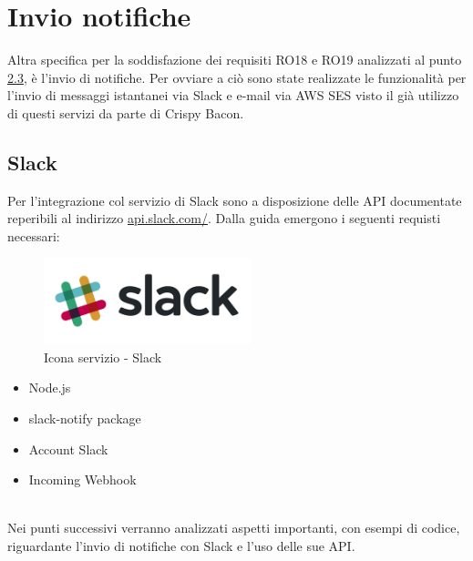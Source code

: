 \section{Invio notifiche}
Altra specifica per la soddisfazione dei requisiti RO18 e RO19 analizzati al punto \hyperref[requisti-richiesti]{2.3}, è l'invio di notifiche. Per ovviare a ciò sono state realizzate le funzionalità per l'invio di messaggi istantanei via Slack e e-mail via AWS SES visto il già utilizzo di questi servizi da parte di Crispy Bacon.
\subsection{Slack}
Per l’integrazione col servizio di Slack sono a disposizione delle API documentate reperibili al indirizzo \href{https://api.slack.com/}{api.slack.com/}. Dalla guida emergono i seguenti requisti necessari:
\\
\begin{minipage}{0.5\textwidth}
	\begin{figure}[H]
		\includegraphics[width=6cm]{immagini/slack.png}
		\caption{\label{fig:icona_slack}Icona servizio - Slack}
	\end{figure}
\end{minipage}
\begin{minipage}{0.5\textwidth}
	\begin{itemize}
		\item Node.js
		\item slack-notify package
		\item Account Slack
		\item Incoming Webhook
	\end{itemize}
\end{minipage}
\\[0.4cm]
Nei punti successivi verranno analizzati aspetti importanti, con esempi di codice, riguardante l'invio di notifiche con Slack e l’uso delle sue API.
